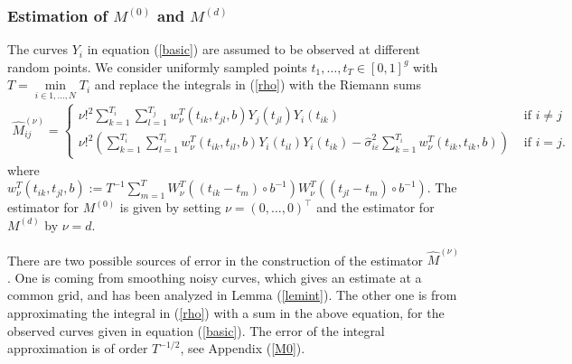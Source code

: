 \subsubsection{Estimation of $M^{(0)}$ and $M^{(d)}$ }  The curves $Y_i$ in equation (\ref{basic}) are assumed to be observed at different random points. We consider uniformly sampled points $t_1,\dots,t_{T} \in [0,1]^g$  with $T=\underset{i \in {1,\dots,N}}{\operatorname{min}}T_i$ and replace the integrals in (\ref{rho}) with the Riemann sums %
\begin{equation*}
\begin{split}
\hat{M}^{(\nu)}_{ij}= \begin{cases}  \nu!^2 \sum_{k=1}^{T_i} \sum_{l=1}^{T_j}  w_\nu^T(t_{ik},t_{jl},b) Y_j(t_{jl}) Y_i(t_{ik})  &\text{ if } i \neq j  \\ 
\nu!^2 \left( \sum_{k=1}^{T_i} \sum_{l=1}^{T_i} w_\nu^T(t_{ik},t_{il},b)  Y_i(t_{il}) Y_i(t_{ik}) -  \hat{\sigma}_{i\varepsilon}^2  \sum_{k=1}^{T_i} w_\nu^T(t_{ik},t_{ik},b) \right)   &\text{ if } i = j .\end{cases} 
\end{split}
\end{equation*}
where $w_{\nu}^T(t_{ik},t_{jl},b)  :=T^{-1} \sum_{m=1}^T W^T_{\nu} \left((t_{ik}-t_m)\circ b^{-1} \right)  W^T_{\nu}\left((t_{jl}-t_m)\circ b^{-1} \right)$. The estimator for $M^{(0)}$ is given by setting $\nu=(0,\dots,0)^\top$ and the estimator for $M^{(d)}$ by $\nu=d$. 


There are two possible sources of error in the construction of the estimator $\hat{M}^{(\nu)}$. One is coming from smoothing noisy curves, which gives an estimate at a common grid, and has been analyzed in Lemma (\ref{lemint}). The other one is from approximating the integral in (\ref{rho}) with a sum in the above equation, for the observed curves given in equation (\ref{basic}). The error of the integral approximation is of order $T^{-1/2}$, see Appendix (\ref{M0}). 

